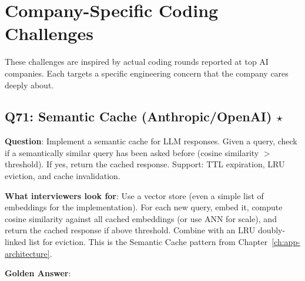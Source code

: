 \section{Company-Specific Coding Challenges}

These challenges are inspired by actual coding rounds reported at top AI companies. Each targets a specific engineering concern that the company cares deeply about.

\subsection{Q71: Semantic Cache (Anthropic/OpenAI) $\star$}

\textbf{Question}: Implement a semantic cache for LLM responses. Given a query, check if a semantically similar query has been asked before (cosine similarity $>$ threshold). If yes, return the cached response. Support: TTL expiration, LRU eviction, and cache invalidation.

\textbf{What interviewers look for}: Use a vector store (even a simple list of embeddings for the implementation). For each new query, embed it, compute cosine similarity against all cached embeddings (or use ANN for scale), and return the cached response if above threshold. Combine with an LRU doubly-linked list for eviction. This is the Semantic Cache pattern from Chapter~\ref{ch:app-architecture}.

\textbf{Golden Answer}:

